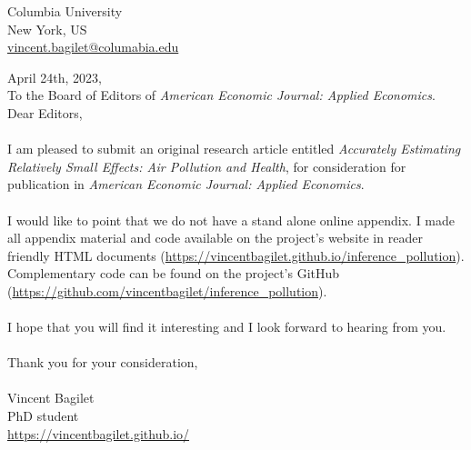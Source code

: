 \documentclass[11pt]{article}
\begin{document}

\begin{flushright}
Columbia University \\
New York, US \\
\url{vincent.bagilet@columabia.edu}
\end{flushright}

April 24th, 2023, \\

To the Board of Editors of \textit{American Economic Journal: Applied Economics}. \\

Dear Editors,
\\
\\
I am pleased to submit an original research article entitled \textit{Accurately Estimating Relatively Small Effects: Air Pollution and Health}, for consideration for publication in \textit{American Economic Journal: Applied Economics}.
\\
\\
I would like to point that we do not have a stand alone online appendix. I made all appendix material and code available on the project's website in reader friendly HTML documents (\url{https://vincentbagilet.github.io/inference_pollution}). Complementary code can be found on the project's GitHub (\url{https://github.com/vincentbagilet/inference_pollution}).
\\
\\
I hope that you will find it interesting and I look forward to hearing from you.
\\
\\
Thank you for your consideration,
\\
\\
Vincent Bagilet \\
PhD student\\
\url{https://vincentbagilet.github.io/}
\end{document}
